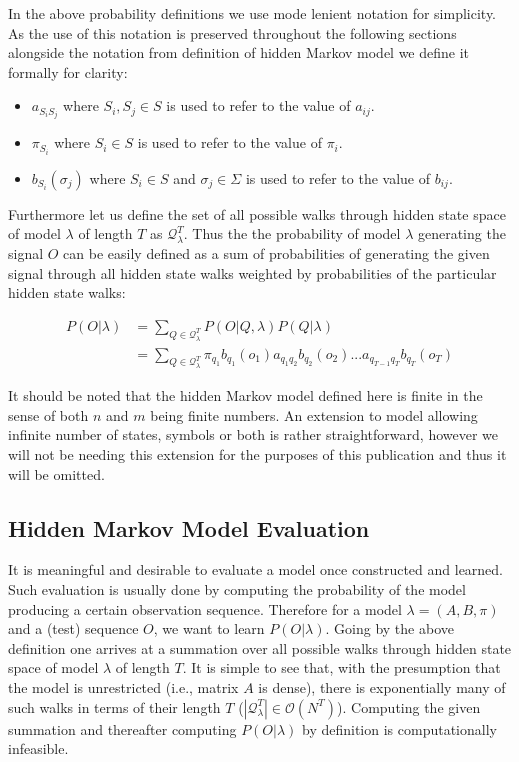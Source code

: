 \documentclass[a4paper,12pt]{article}
\begin{document}
In the above probability definitions we use mode lenient notation for simplicity. As the use of this notation is preserved throughout the following sections alongside the notation from definition of hidden Markov model we define it formally for clarity:
\begin{itemize}
	\item[] $a_{S_iS_j}$ where $S_i, S_j\in S$ is used to refer to the value of $a_{ij}$.
	\item[] $\pi_{S_i}$ where $S_i\in S$ is used to refer to the value of $\pi_i$.
	\item[] $b_{S_i}(\sigma_j)$ where $S_i\in S$ and $\sigma_j\in \Sigma$ is used to refer to the value of $b_{ij}$.
\end{itemize}

Furthermore let us define the set of all possible walks through hidden state space of model $\lambda$ of length $T$ as $\mathcal{Q}_\lambda^T$. Thus the the probability of model $\lambda$ generating the signal $O$ can be easily defined as a sum of probabilities of generating the given signal through all hidden state walks weighted by probabilities of the particular hidden state walks: 

\begin{align*}
P(O|\lambda)&=\sum_{Q\in\mathcal{Q}^T_\lambda}{P(O|Q,\lambda)P(Q|\lambda)}\\
&=\sum_{Q\in\mathcal{Q}^T_\lambda}{\pi_{q_1}b_{q_1}(o_1)a_{q_1q_2}b_{q_2}(o_2)...a_{q_{T-1}q_T}b_{q_T}(o_T)}
\end{align*}

It should be noted that the hidden Markov model defined here is finite in the sense of both $n$ and $m$ being finite numbers. An extension to model allowing infinite number of states, symbols or both is rather straightforward, however we will not be needing this extension for the purposes of this publication and thus it will be omitted.

\subsection{Hidden Markov Model Evaluation}
It is meaningful and desirable to evaluate a model once constructed and learned. Such evaluation is usually done by computing the probability of the model producing a certain observation sequence. Therefore for a model $\lambda = (A, B, \pi)$ and a (test) sequence $O$, we want to learn $P(O|\lambda)$. Going by the above definition one arrives at a summation over all possible walks through hidden state space of model $\lambda$ of length $T$. It is simple to see that, with the presumption that the model is unrestricted (i.e., matrix $A$ is dense), there is exponentially many of such walks in terms of their length $T$ ($|\mathcal{Q}_\lambda^T|\in\mathcal{O}(N^T)$). Computing the given summation and thereafter computing $P(O|\lambda)$ by definition is computationally infeasible.
\end{document}
